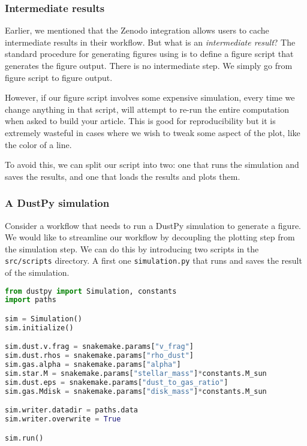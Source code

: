 \documentclass{aa}
\begin{document}
\subsubsection{Intermediate results}

Earlier, we mentioned that the Zenodo integration allows users to cache intermediate results in their workflow.
But what is an \textit{intermediate result}?
The standard procedure for generating figures using \showyourwork is to define a figure script that generates the figure output.
There is no intermediate step. We simply go from figure script to figure output.

However, if our figure script involves some expensive simulation, every time we change anything in that script, \showyourwork will attempt to re-run the entire computation when asked to build your article.
This is good for reproducibility but it is extremely wasteful in cases where we wish to tweak some aspect of the plot, like the color of a line.

To avoid this, we can split our script into two: one that runs the simulation and saves the results, and one that loads the results and plots them.

\subsubsection{A DustPy simulation}

Consider a workflow that needs to run a DustPy simulation to generate a figure.
We would like to streamline our workflow by decoupling the plotting step from the simulation step.
We can do this by introducing two scripts in the \texttt{src/scripts} directory.
A first one \texttt{simulation.py} that runs and saves the result of the simulation. 

\begin{lstlisting}[language=python, caption=simulations.py]
from dustpy import Simulation, constants
import paths

sim = Simulation()
sim.initialize()

sim.dust.v.frag = snakemake.params["v_frag"]
sim.dust.rhos = snakemake.params["rho_dust"]
sim.gas.alpha = snakemake.params["alpha"]
sim.star.M = snakemake.params["stellar_mass"]*constants.M_sun
sim.dust.eps = snakemake.params["dust_to_gas_ratio"]
sim.gas.Mdisk = snakemake.params["disk_mass"]*constants.M_sun

sim.writer.datadir = paths.data
sim.writer.overwrite = True

sim.run()
\end{lstlisting}
\end{document}
